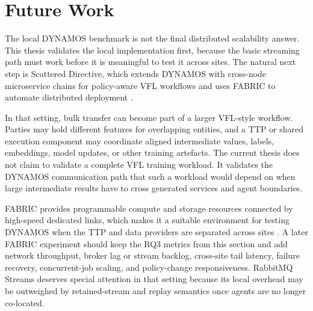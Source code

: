 \section{Future Work}

The local DYNAMOS benchmark is not the final distributed scalability answer. This thesis validates the local implementation first, because the basic streaming path must work before it is meaningful to test it across sites. The natural next step is Scattered Directive, which extends DYNAMOS with cross-node microservice chains for policy-aware VFL workflows and uses FABRIC to automate distributed deployment \cite{jongejans2025scattered,scatteredDirectiveRepo2026}.

In that setting, bulk transfer can become part of a larger VFL-style workflow. Parties may hold different features for overlapping entities, and a TTP or shared execution component may coordinate aligned intermediate values, labels, embeddings, model updates, or other training artefacts. The current thesis does not claim to validate a complete VFL training workload. It validates the DYNAMOS communication path that such a workload would depend on when large intermediate results have to cross generated services and agent boundaries.

FABRIC provides programmable compute and storage resources connected by high-speed dedicated links, which makes it a suitable environment for testing DYNAMOS when the TTP and data providers are separated across sites \cite{baldin2019fabric,fabricPortal2026}. A later FABRIC experiment should keep the RQ3 metrics from this section and add network throughput, broker lag or stream backlog, cross-site tail latency, failure recovery, concurrent-job scaling, and policy-change responsiveness. RabbitMQ Streams deserves special attention in that setting because its local overhead may be outweighed by retained-stream and replay semantics once agents are no longer co-located.

